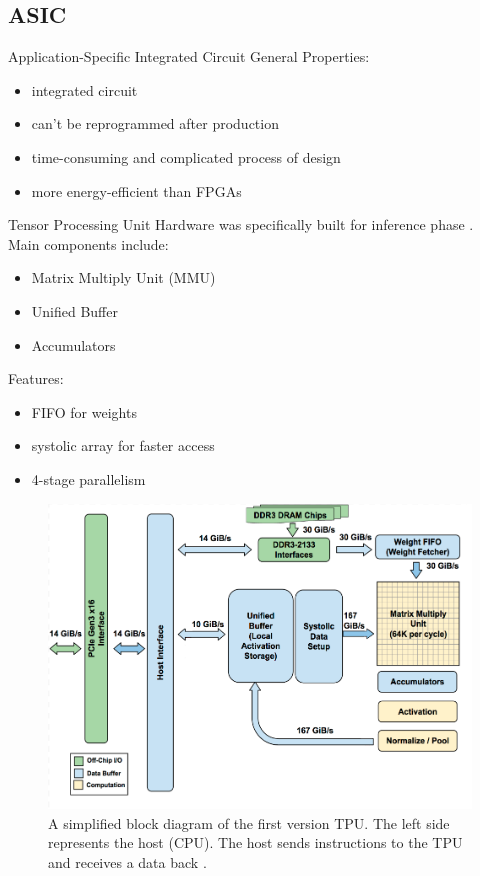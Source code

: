 \documentclass[en]{sdqbeamer}
\begin{document}
	\subsection{ASIC}
	\begin{frame}{Application-Specific Integrated Circuit}
		General Properties:
		\begin{itemize}
			\item integrated circuit
			\item can't be reprogrammed after production
			\item time-consuming and complicated process of design
			\item more energy-efficient than FPGAs
		\end{itemize}
	\end{frame}
	
	\begin{frame}{Tensor Processing Unit}
		Hardware was specifically built for inference phase \cite{jouppi2017datacenter}.\\
		Main components include:
		\begin{itemize}
			\item Matrix Multiply Unit (MMU)
			\item Unified Buffer
			\item Accumulators
		\end{itemize}
		Features:
		\begin{itemize}
			\item FIFO for weights
			\item systolic array for faster access
			\item 4-stage parallelism
		\end{itemize}
	\end{frame}
	
	\begin{frame}
		\begin{figure}
			\centering
			\includegraphics[width= 0.5\paperwidth]{pictures/tpu_floorplan.png}
			\caption{A simplified block diagram of the first version TPU. The left side represents the host (CPU). The host sends instructions to the TPU and receives a data back \cite{jouppi2017datacenter}.}
		\end{figure}
	\end{frame}
	
\end{document}
